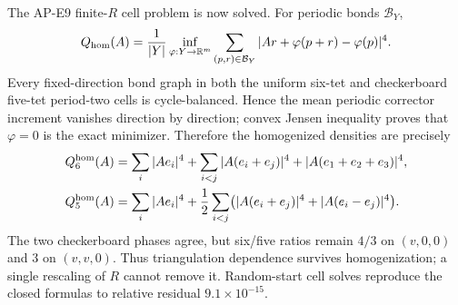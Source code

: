 \documentclass[11pt]{article}
\numberwithin{equation}{section}
\newcommand{\RR}{\mathbb R}
\begin{document}
The AP-E9 finite-$R$ cell problem is now solved.  For periodic bonds
$\mathcal B_Y$,
\begin{equation}
 Q_{\rm hom}(A)=\frac1{|Y|}\inf_{\varphi:Y\to\RR^m}
 \sum_{(p,r)\in\mathcal B_Y}|Ar+\varphi(p+r)-\varphi(p)|^4.
 \label{eq:e10-cell}
\end{equation}
Every fixed-direction bond graph in both the uniform six-tet and checkerboard
five-tet period-two cells is cycle-balanced.  Hence the mean periodic
corrector increment vanishes direction by direction; convex Jensen
inequality proves that $\varphi=0$ is the exact minimizer.  Therefore the
homogenized densities are precisely
\begin{align}
 Q_6^{\rm hom}(A)&=\sum_i|Ae_i|^4+\sum_{i<j}|A(e_i+e_j)|^4
 +|A(e_1+e_2+e_3)|^4,\\
 Q_5^{\rm hom}(A)&=\sum_i|Ae_i|^4+\frac12\sum_{i<j}
 \bigl(|A(e_i+e_j)|^4+|A(e_i-e_j)|^4\bigr).
\end{align}
The two checkerboard phases agree, but six/five ratios remain $4/3$ on
$(v,0,0)$ and $3$ on $(v,v,0)$.  Thus triangulation dependence survives
homogenization; a single rescaling of $R$ cannot remove it.  Random-start cell
solves reproduce the closed formulas to relative residual
$9.1\times10^{-15}$.
\end{document}
